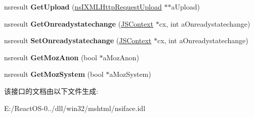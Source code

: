 \begin{DoxyCompactItemize}
\item 
\mbox{\label{interfacens_i_x_m_l_http_request_af8b607f72973bda5831fb75f841abe7e}} 
nsresult {\bfseries Get\+Upload} (\hyperlink{interfacens_i_supports}{ns\+I\+X\+M\+L\+Http\+Request\+Upload} $\ast$$\ast$a\+Upload)
\item 
\mbox{\label{interfacens_i_x_m_l_http_request_aad2076aa94263ae73042281c1443d13e}} 
nsresult {\bfseries Get\+Onreadystatechange} (\hyperlink{interfacevoid}{J\+S\+Context} $\ast$cx, int a\+Onreadystatechange)
\item 
\mbox{\label{interfacens_i_x_m_l_http_request_a62b5d31b314e96b0dec7ed5202a888d9}} 
nsresult {\bfseries Set\+Onreadystatechange} (\hyperlink{interfacevoid}{J\+S\+Context} $\ast$cx, int a\+Onreadystatechange)
\item 
\mbox{\label{interfacens_i_x_m_l_http_request_a9648556a78c65fa01e384f87de0bdc1d}} 
nsresult {\bfseries Get\+Moz\+Anon} (bool $\ast$a\+Moz\+Anon)
\item 
\mbox{\label{interfacens_i_x_m_l_http_request_a2033ee4e8fc34828b98166e96602c50f}} 
nsresult {\bfseries Get\+Moz\+System} (bool $\ast$a\+Moz\+System)
\end{DoxyCompactItemize}


该接口的文档由以下文件生成\+:\begin{DoxyCompactItemize}
\item 
E\+:/\+React\+O\+S-\/0../dll/win32/mshtml/nsiface.\+idl\end{DoxyCompactItemize}
